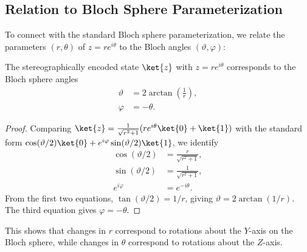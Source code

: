 \subsection{Relation to Bloch Sphere Parameterization}

To connect with the standard Bloch sphere parameterization, we relate the parameters $(r, \theta)$ of $z = re^{i\theta}$ to the Bloch angles $(\vartheta, \varphi)$:

\begin{proposition}
\label{prop:bloch-angles}
The stereographically encoded state $\ket{z}$ with $z = re^{i\theta}$ corresponds to the Bloch sphere angles
\begin{align}
    \vartheta &= 2\arctan\left(\frac{1}{r}\right), \\
    \varphi &= -\theta.
\end{align}
\end{proposition}

\begin{proof}
Comparing $\ket{z} = \frac{1}{\sqrt{r^2+1}}(re^{i\theta}\ket{0} + \ket{1})$ with the standard form $\cos(\vartheta/2)\ket{0} + e^{i\varphi}\sin(\vartheta/2)\ket{1}$, we identify
\begin{align}
    \cos(\vartheta/2) &= \frac{r}{\sqrt{r^2+1}}, \\
    \sin(\vartheta/2) &= \frac{1}{\sqrt{r^2+1}}, \\
    e^{i\varphi} &= e^{-i\theta}.
\end{align}
From the first two equations, $\tan(\vartheta/2) = 1/r$, giving $\vartheta = 2\arctan(1/r)$. The third equation gives $\varphi = -\theta$.
\end{proof}

This shows that changes in $r$ correspond to rotations about the $Y$-axis on the Bloch sphere, while changes in $\theta$ correspond to rotations about the $Z$-axis.
